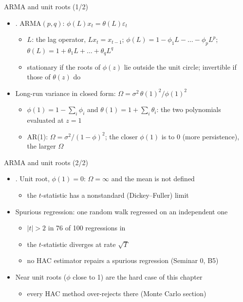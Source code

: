 \begin{frame}{ARMA and unit roots (1/2)}
\itemsize{\small}
\begin{itemize}
    \item {}. ARMA$(p,q)$: $\phi(L)x_t = \theta(L)\varepsilon_t$
    \begin{itemize}
        \item $L$: the lag operator, $Lx_t = x_{t-1}$; $\phi(L) = 1 - \phi_1L - \dots - \phi_pL^p$; $\theta(L) = 1 + \theta_1L + \dots + \theta_qL^q$
        \item stationary if the roots of $\phi(z)$ lie outside the unit circle; invertible if those of $\theta(z)$ do
    \end{itemize}
    \item Long-run variance in closed form: $\Omega = \sigma^2\,\theta(1)^2/\phi(1)^2$
    \begin{itemize}
        \item $\phi(1) = 1 - \sum_i\phi_i$ and $\theta(1) = 1 + \sum_i\theta_i$: the two polynomials evaluated at $z = 1$
        \item AR(1): $\Omega = \sigma^2/(1-\phi)^2$; the closer $\phi(1)$ is to 0 (more persistence), the larger $\Omega$
    \end{itemize}
\end{itemize}
\end{frame}

\begin{frame}{ARMA and unit roots (2/2)}
\itemsize{\small}
\begin{itemize}
    \item {}. Unit root, $\phi(1) = 0$: $\Omega = \infty$ and the mean is not defined
    \begin{itemize}
        \item the $t$-statistic has a nonstandard (Dickey--Fuller) limit
    \end{itemize}
    \item Spurious regression: one random walk regressed on an independent one
    \begin{itemize}
        \item $|t| > 2$ in 76 of 100 regressions in 
        \item the $t$-statistic diverges at rate $\sqrt{T}$ 
        \item no HAC estimator repairs a spurious regression (Seminar 0, B5)
    \end{itemize}
    \item Near unit roots ($\phi$ close to 1) are the hard case of this chapter
    \begin{itemize}
        \item every HAC method over-rejects there (Monte Carlo section)
    \end{itemize}
\end{itemize}
\end{frame}

